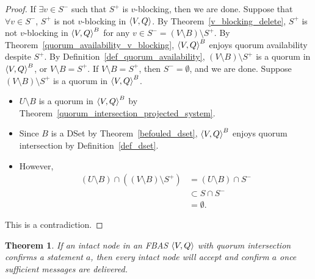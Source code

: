 \documentclass[12pt, psamsfonts]{amsart}
\newtheorem{thm}{Theorem}[section]
\theoremstyle{definition}
\theoremstyle{remark}
\numberwithin{equation}{section}
\begin{document}
\begin{proof}
    If $\exists v \in S^{-}$ such that $S^{+}$ is $v$-blocking, then we are done.
    Suppose that $\forall v \in S^{-}$, $S^{+}$ is not $v$-blocking in $\ev{V, Q}$.
    By Theorem~\ref{v_blocking_delete}, $S^{+}$ is not $v$-blocking in $\ev{V, Q}^B$ for any $v \in S^{-} = (V \setminus B) \setminus S^{+}$.
    By Theorem~\ref{quorum_availability_v_blocking}, $\ev{V, Q}^B$ enjoys quorum availability despite $S^{+}$.
    By Definition~\ref{def_quorum_availability}, $(V \setminus B) \setminus S^{+}$ is a quorum in $\ev{V, Q}^B$, or $V \setminus B = S^{+}$.
    If $V \setminus B = S^{+}$, then $S^{-} = \emptyset$, and we are done.
    Suppose $(V \setminus B) \setminus S^{+}$ is a quorum in $\ev{V, Q}^B$.
    \begin{itemize}
        \item
            $U \setminus B$ is a quorum in $\ev{V, Q}^B$ by Theorem~\ref{quorum_intersection_projected_system}.
        \item
            Since $B$ is a DSet by Theorem~\ref{befouled_dset}, $\ev{V, Q}^B$ enjoys quorum intersection by Definition~\ref{def_dset}.
        \item
            However,
            \begin{align*}
                (U \setminus B) \cap ((V \setminus B) \setminus S^{+})
                    &= (U \setminus B) \cap S^{-} \\
                    &\subset S \cap S^{-} \\
                    &= \emptyset.
            \end{align*}
    \end{itemize}
    This is a contradiction.
\end{proof}

\begin{thm}
    If an intact node in an FBAS $\ev{V, Q}$ with quorum intersection confirms a statement $a$, then every intact node will accept and confirm $a$ once sufficient messages are delivered.
\end{thm}
\end{document}
